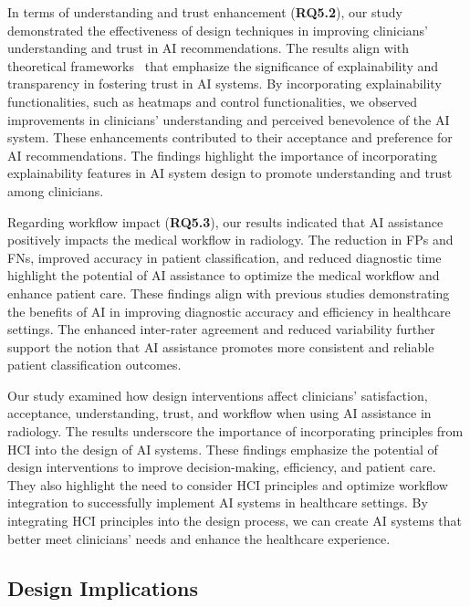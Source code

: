 In terms of understanding and trust enhancement ({\bf RQ5.2}), our study demonstrated the effectiveness of design techniques in improving clinicians' understanding and trust in \ac{AI} recommendations.
The results align with theoretical frameworks~\cite{LANDRO2020102897, 10.1145/3311957.3361858} that emphasize the significance of explainability and transparency in fostering trust in \ac{AI} systems.
By incorporating explainability functionalities, such as heatmaps and control functionalities, we observed improvements in clinicians' understanding and perceived benevolence of the \ac{AI} system.
These enhancements contributed to their acceptance and preference for \ac{AI} recommendations.
The findings highlight the importance of incorporating explainability features in \ac{AI} system design to promote understanding and trust among clinicians.

Regarding workflow impact ({\bf RQ5.3}), our results indicated that \ac{AI} assistance positively impacts the medical workflow in radiology.
The reduction in \acp{FP} and \acp{FN}, improved accuracy in patient classification, and reduced diagnostic time highlight the potential of \ac{AI} assistance to optimize the medical workflow and enhance patient care.
These findings align with previous studies demonstrating the benefits of \ac{AI} in improving diagnostic accuracy and efficiency in healthcare settings.
The enhanced inter-rater agreement and reduced variability further support the notion that \ac{AI} assistance promotes more consistent and reliable patient classification outcomes.

Our study examined how design interventions affect clinicians' satisfaction, acceptance, understanding, trust, and workflow when using \ac{AI} assistance in radiology.
The results underscore the importance of incorporating principles from \ac{HCI} into the design of \ac{AI} systems.
These findings emphasize the potential of design interventions to improve decision-making, efficiency, and patient care.
They also highlight the need to consider \ac{HCI} principles and optimize workflow integration to successfully implement \ac{AI} systems in healthcare settings.
By integrating \ac{HCI} principles into the design process, we can create \ac{AI} systems that better meet clinicians' needs and enhance the healthcare experience.

\subsection{Design Implications}
\label{sec:chap005007002}

